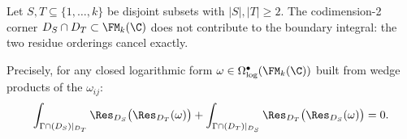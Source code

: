 \begin{theorem}
\label{thm:Arnold_full_proof}
Let $S, T \subseteq \{1,\ldots,k\}$ be disjoint subsets with $|S|, |T| \geq 2$. The codimension-2 corner $D_S \cap D_T \subset \FM_k(\C)$ does not contribute to the boundary integral: the two residue orderings cancel exactly.

Precisely, for any closed logarithmic form $\omega \in \Omega^\bullet_{\log}(\FM_k(\C))$ built from wedge products of the $\omega_{ij}$:
\begin{equation}
\label{eq:corner_cancellation}
\int_{\Gamma \cap (D_S)|_{D_T}} \Res_{D_S}\bigl(\Res_{D_T}(\omega)\bigr) + \int_{\Gamma \cap (D_T)|_{D_S}} \Res_{D_T}\bigl(\Res_{D_S}(\omega)\bigr) = 0.
\end{equation}
\end{theorem}

